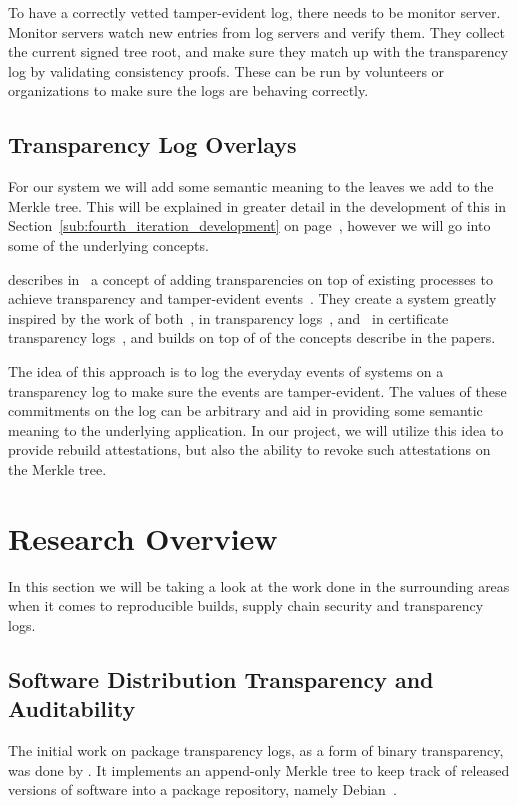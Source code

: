 \documentclass[../Main/thesis.tex]{subfiles}
\begin{document}
To have a correctly vetted tamper-evident log, there needs to be monitor server.
Monitor servers watch new entries from log servers and verify them. They collect
the current signed tree root, and make sure they match up with the transparency
log by validating consistency proofs. These can be run by volunteers or
organizations to make sure the logs are behaving correctly. 

\subsection*{Transparency Log Overlays}%
\label{sub:transparency_log_overlays}
For our system we will add some semantic meaning to the leaves we add to the
Merkle tree. This will be explained in greater detail in the development of
this in Section~\ref{sub:fourth_iteration_development} on
page~\pageref{sub:fourth_iteration_development}, however we will go into some of
the underlying concepts.

\citeauthor{10.11452976749.2978404} describes
in~ a concept of adding transparencies on top
of existing processes to achieve transparency and tamper-evident
events~\cite{10.11452976749.2978404}. They create a system greatly inspired by
the work of both~\citeauthor{182788}, in transparency logs~\cite{182788},
and~\citeauthor{b.-laurie-a.-langley-e.kaster-google-2013} in certificate
transparency logs~\cite{b.-laurie-a.-langley-e.kaster-google-2013}, and builds
on top of of the concepts describe in the papers.

The idea of this approach is to log the everyday events of systems on a
transparency log to make sure the events are tamper-evident. The values of these
commitments on the log can be arbitrary and aid in providing some semantic
meaning to the underlying application. In our project, we will utilize this idea
to provide rebuild attestations, but also the ability to revoke such attestations
on the Merkle tree.

\section{Research Overview}%
\label{sec:research_overview}
In this section we will be taking a look at the work done in the surrounding
areas when it comes to reproducible builds, supply chain security and
transparency logs.

\subsection{Software Distribution Transparency and Auditability}\label{sec:benjamin}
The initial work on package transparency logs, as a form of binary transparency,
was done by \citeauthor{1711.07278v1}. It implements an append-only Merkle tree to
keep track of released versions of software into a package repository, namely
Debian~\cite{1711.07278v1}.
\end{document}
